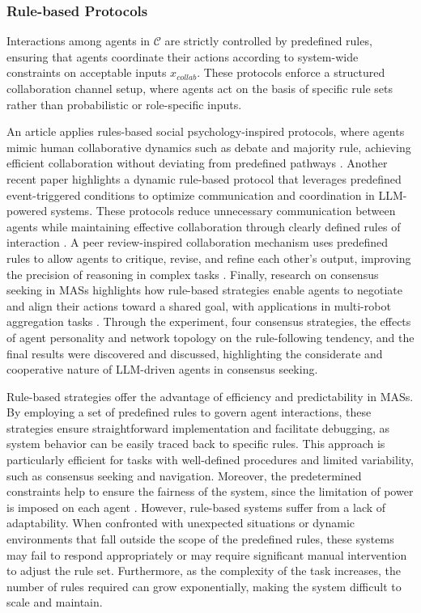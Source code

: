 \documentclass[acmsmall,nonacm]{acmart}
\begin{document}
        \subsubsection{Rule-based Protocols}
        Interactions among agents in $\mathcal{C}$ are strictly controlled by predefined rules, ensuring that agents coordinate their actions according to system-wide constraints on acceptable inputs $x_{collab}$. These protocols enforce a structured collaboration channel setup, where agents act on the basis of specific rule sets rather than probabilistic or role-specific inputs. 
        
        An article applies rules-based social psychology-inspired protocols, where agents mimic human collaborative dynamics such as debate and majority rule, achieving efficient collaboration without deviating from predefined pathways \cite{zhang-etal-2024-exploring}. Another recent paper highlights a dynamic rule-based protocol that leverages predefined event-triggered conditions to optimize communication and coordination in LLM-powered systems. These protocols reduce unnecessary communication between agents while maintaining effective collaboration through clearly defined rules of interaction \cite{Zhuang2024PoSE}. A peer review-inspired collaboration mechanism uses predefined rules to allow agents to critique, revise, and refine each other's output, improving the precision of reasoning in complex tasks \cite{xu2023towards}. Finally, research on consensus seeking in MASs highlights how rule-based strategies enable agents to negotiate and align their actions toward a shared goal, with applications in multi-robot aggregation tasks \cite{Chen2023MultiAgent}. Through the experiment, four consensus strategies, the effects of agent personality and network topology on the rule-following tendency, and the final results were discovered and discussed, highlighting the considerate and cooperative nature of LLM-driven agents in consensus seeking.

        Rule-based strategies offer the advantage of efficiency and predictability in MASs. By employing a set of predefined rules to govern agent interactions, these strategies ensure straightforward implementation and facilitate debugging, as system behavior can be easily traced back to specific rules. This approach is particularly efficient for tasks with well-defined procedures and limited variability, such as consensus seeking and navigation. Moreover, the predetermined constraints help to ensure the fairness of the system, since the limitation of power is imposed on each agent \cite{zhang-etal-2024-exploring}. However, rule-based systems suffer from a lack of adaptability. When confronted with unexpected situations or dynamic environments that fall outside the scope of the predefined rules, these systems may fail to respond appropriately or may require significant manual intervention to adjust the rule set. Furthermore, as the complexity of the task increases, the number of rules required can grow exponentially, making the system difficult to scale and maintain.
\end{document}
